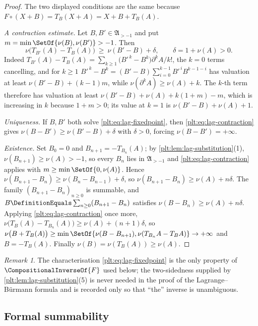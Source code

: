 \documentclass[11pt,oneside]{article}
\theoremstyle{plain}
\theoremstyle{definition}
\theoremstyle{remark}
\newtheorem{remark}[theorem]{Remark}
\newcommand{\compose}{\mathbin{\circ}}
\newcommand{\rev}[1]{\CompositionalInverseOf{#1}}
\begin{document}
\begin{proof}
The two displayed conditions are the same because
\(F\compose(X+B)=T_B(X+A)=X+B+T_B(A)\).

\emph{A contraction estimate.}  Let \(B,B'\in\mathfrak A_{>-1}\) and put
\(m=\min\SetOf{\nu(B),\nu(B')}>-1\).  Then
\begin{equation}
\label{plt:eq:lag-contraction}
  \nu\bigl(T_{B'}(A)-T_B(A)\bigr)\ \ge\ \nu(B'-B)+\delta,
  \qquad \delta=1+\nu(A)>0 .
\end{equation}
Indeed \(T_{B'}(A)-T_B(A)=\sum_{k\ge1}\bigl(B'^{\,k}-B^k\bigr)\partial^kA/k!\),
the \(k=0\) terms cancelling, and for \(k\ge1\)
\(B'^{\,k}-B^k=(B'-B)\sum_{i=0}^{k-1}B'^{\,i}B^{k-1-i}\) has valuation at least
\(\nu(B'-B)+(k-1)m\), while \(\nu(\partial^kA)\ge\nu(A)+k\).  The \(k\)-th term
therefore has valuation at least
\(\nu(B'-B)+\nu(A)+k(1+m)-m\), which is increasing in \(k\) because
\(1+m>0\); its value at \(k=1\) is \(\nu(B'-B)+\nu(A)+1\).

\emph{Uniqueness.}  If \(B,B'\) both solve \cref{plt:eq:lag-fixedpoint}, then
\cref{plt:eq:lag-contraction} gives
\(\nu(B-B')\ge\nu(B'-B)+\delta\) with \(\delta>0\), forcing
\(\nu(B-B')=+\infty\).

\emph{Existence.}  Set \(B_0=0\) and \(B_{n+1}=-T_{B_n}(A)\); by
\cref{plt:lem:lag-substitution}(1), \(\nu(B_{n+1})\ge\nu(A)>-1\), so every
\(B_n\) lies in \(\mathfrak A_{>-1}\) and
\cref{plt:eq:lag-contraction} applies with
\(m\ge\min\SetOf{0,\nu(A)}\).  Hence
\(\nu(B_{n+1}-B_n)\ge\nu(B_n-B_{n-1})+\delta\), so
\(\nu(B_{n+1}-B_n)\ge\nu(A)+n\delta\).  The family \((B_{n+1}-B_n)_{n\ge0}\) is
summable, and \(B\DefinitionEquals\sum_{n\ge0}(B_{n+1}-B_n)\) satisfies
\(\nu(B-B_n)\ge\nu(A)+n\delta\).  Applying
\cref{plt:eq:lag-contraction} once more,
\(\nu\bigl(T_B(A)-T_{B_n}(A)\bigr)\ge\nu(A)+(n+1)\delta\), so
\(\nu\bigl(B+T_B(A)\bigr)\ge
\min\SetOf{\nu(B-B_{n+1}),\nu(T_{B_n}A-T_BA)}\to+\infty\)
and \(B=-T_B(A)\).  Finally \(\nu(B)=\nu(T_B(A))\ge\nu(A)\).
\end{proof}

\begin{remark}
The characterisation \cref{plt:eq:lag-fixedpoint} is the only property of
\(\rev{F}\) used below; the two-sidedness supplied by
\cref{plt:lem:lag-substitution}(5) is never needed in the proof of the
Lagrange--B\"urmann formula and is recorded only so that
``the'' inverse is unambiguous.
\end{remark}

\subsection{Formal summability}
\label{plt:sec:lag-summability}
\end{document}

